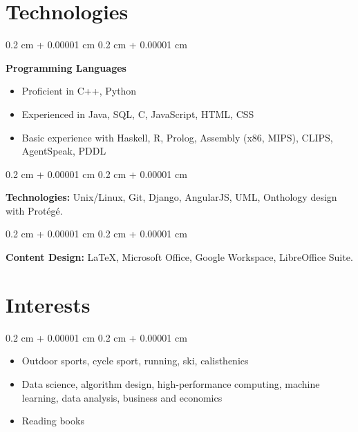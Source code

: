 \documentclass[10pt, letterpaper]{article}
\newenvironment{highlightsforbulletentries}{
    \begin{itemize}[
        topsep=0.10 cm,
        parsep=0.10 cm,
        partopsep=0pt,
        itemsep=0pt,
        leftmargin=10pt
    ]
}{
    \end{itemize}
} %
\newenvironment{onecolentry}{
    \begin{adjustwidth}{
        0.2 cm + 0.00001 cm
    }{
        0.2 cm + 0.00001 cm
    }
}{
    \end{adjustwidth}
} %
\begin{document}
    
    \section{Technologies}
        \begin{onecolentry}
            \textbf{Programming Languages}
                \begin{highlightsforbulletentries}
                    \item Proficient in C++, Python
                    \item Experienced in Java, SQL, C, JavaScript, HTML, CSS
                    \item Basic experience with Haskell, R, Prolog, Assembly (x86, MIPS), CLIPS, AgentSpeak, PDDL
                \end{highlightsforbulletentries}
        \end{onecolentry}

        \vspace{0.2 cm}

        \begin{onecolentry}
            \textbf{Technologies:} Unix/Linux, Git, Django, AngularJS, UML, Onthology design
            with Protégé.
        \end{onecolentry}
        
        \vspace{0.2 cm}
        
        \begin{onecolentry}
            \textbf{Content Design:} LaTeX, Microsoft Office, Google Workspace, LibreOffice Suite.
        \end{onecolentry}


    \section{Interests}
        \begin{onecolentry}
            \begin{highlightsforbulletentries}
                \item Outdoor sports, cycle sport, running, ski, calisthenics
                \item Data science, algorithm design, high-performance computing, machine learning,
                data analysis, business and economics
                \item Reading books
            \end{highlightsforbulletentries}
        \end{onecolentry}
    
\end{document}
